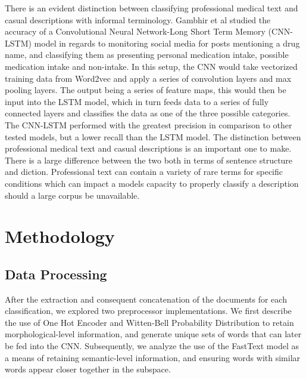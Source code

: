 \documentclass[12pt]{report}
\begin{document}
There is an evident distinction between classifying professional medical text
and casual descriptions with informal terminology. Gambhir et al studied the
accuracy of a Convolutional Neural Network-Long Short Term Memory (CNN-LSTM)
model in regards to monitoring social media for posts mentioning a drug name,
and classifying them as presenting personal medication intake, possible
medication intake and non-intake. In this setup, the CNN would take
vectorized training data from Word2vec and apply a series of convolution
layers and max pooling layers. The output being a series of feature maps,
this would then be input into the LSTM model, which in turn feeds data to a
series of fully connected layers and classifies the data as one of the three
possible categories. The CNN-LSTM performed with the greatest precision in
comparison to other tested models, but a lower recall than the LSTM model.
The distinction between professional medical text and casual descriptions is
an important one to make. There is a large difference between the two both in
terms of sentence structure and diction. Professional text can contain a
variety of rare terms for specific conditions which can impact a models
capacity to properly classify a description should a large corpus be
unavailable.


\chapter{Methodology} 
\section{Data Processing}

After the extraction and consequent concatenation of the documents for each
classification, we explored two preprocessor implementations. We first describe
the use of One Hot Encoder and Witten-Bell Probability Distribution to retain
morphological-level information, and generate unique sets of words that can
later be fed into the CNN. Subsequently, we analyze the use of the FastText
model as a means of retaining semantic-level information, and ensuring words
with similar words appear closer together in the subspace.
\end{document}
